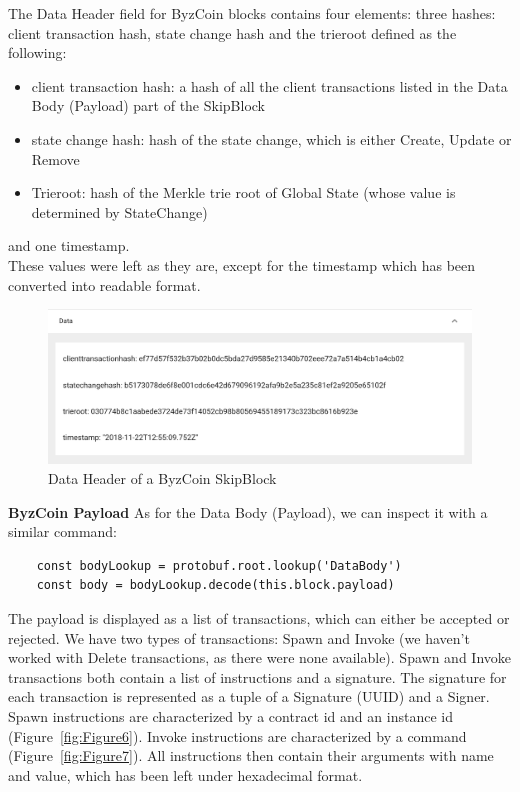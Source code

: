 \documentclass[11pt, a4paper, twoside, openright]{article} %
\begin{document}
{The Data Header field for ByzCoin blocks contains four elements: three hashes: client transaction hash, state change hash and the trieroot defined as the following:
\begin{itemize}
    \item client transaction hash: a hash of all the client transactions listed in the Data Body (Payload) part of the SkipBlock
    \item state change hash: hash of the state change, which is either Create, Update or Remove
    \item Trieroot: hash of the Merkle trie root of Global State (whose value is determined by StateChange)
\end{itemize}
and one timestamp.\\
These values were left as they are, except for the timestamp which has been converted into readable format.
\begin{figure}[h]
    \centering
    \includegraphics[width=\textwidth]{Header.png}
    \caption{Data Header of a ByzCoin SkipBlock}
\end{figure} 
\newline
\newline
\newline
\newline
\textbf{ByzCoin Payload}
\newline
\newline
As for the Data Body (Payload), we can inspect it with a similar command:
\begin{lstlisting}
    const bodyLookup = protobuf.root.lookup('DataBody')
    const body = bodyLookup.decode(this.block.payload)
\end{lstlisting}


The payload is displayed as a list of transactions, which can either be accepted or rejected. We have two types of transactions: Spawn and Invoke (we haven't worked with Delete transactions, as there were none available). Spawn and Invoke transactions both contain a list of instructions and a signature. The signature for each transaction is represented as a tuple of a Signature (UUID) and a Signer.
Spawn instructions are characterized by a contract id and an instance id (Figure~\ref{fig:Figure6}). Invoke instructions are characterized by a command (Figure~\ref{fig:Figure7}). All instructions then contain their arguments with name and value, which has been left under hexadecimal format.

}
\end{document}
